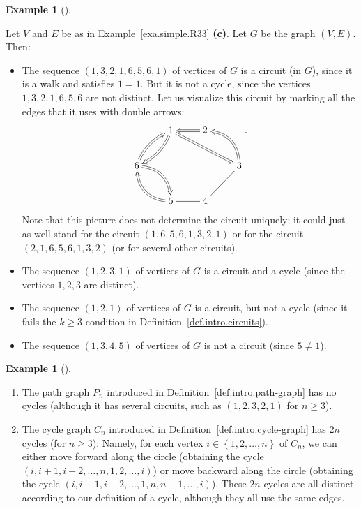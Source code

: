 \documentclass[numbers=enddot,12pt,final,onecolumn,notitlepage]{scrartcl}%
\makeatletter
\theoremstyle{definition}
\newtheorem{exam}[theo]{Example}
\newenvironment{example}[1][]
{\begin{exam}[#1]\begin{leftbar}}
{\end{leftbar}\end{exam}}
\newcommand{\set}[1]{\left\{ #1 \right\}}
\newcommand{\tup}[1]{\left( #1 \right)}
\newcommand{\are}{\ar@{-}}
\makeatother
\begin{document}
\begin{example} \label{exa.intro.circuits}
Let $V$ and $E$ be as in Example~\ref{exa.simple.R33} \textbf{(c)}.
Let $G$ be the graph $\tup{V, E}$. Then:

\begin{itemize}
\item The sequence $\tup{1, 3, 2, 1, 6, 5, 6, 1}$ of vertices of $G$
is a circuit (in $G$), since it is a walk and satisfies $1 = 1$.
But it is not a cycle, since the vertices $1, 3, 2, 1, 6, 5, 6$ are
not distinct.
Let us visualize this circuit by marking all the edges that it uses with
double arrows:
\begin{align*}
\xymatrix{
& 1 \ar@{=>}[rrd] \ar@/^0.5pc/@{=>}[ld] & 2 \ar@{=>}[l] \\
6 \ar@/^0.5pc/@{=>}[ru] \ar@/^1pc/@{=>}[rd] & & & 3 \are[ld] \ar@/_1pc/@{=>}[lu] \\
& 5 \ar@/^1pc/@{=>}[lu] & 4 \are[l]
} .
\end{align*}
Note that this picture does not determine the circuit uniquely;
it could just as well stand for the circuit
$\tup{1, 6, 5, 6, 1, 3, 2, 1}$ or for the circuit
$\tup{2, 1, 6, 5, 6, 1, 3, 2}$ (or for several other
circuits).

\item The sequence $\tup{1, 2, 3, 1}$ of vertices of $G$ is a circuit
and a cycle (since the vertices $1, 2, 3$ are distinct).

\item The sequence $\tup{1, 2, 1}$ of vertices of $G$ is a circuit,
but not a cycle (since it fails the $k \geq 3$ condition in
Definition~\ref{def.intro.circuits}).

\item The sequence $\tup{1, 3, 4, 5}$ of vertices of $G$ is not a
circuit (since $5 \neq 1$).
\end{itemize}
\end{example}

\begin{example}

\begin{enumerate}

\item[\textbf{(a)}]
The path graph $P_n$ introduced in
Definition~\ref{def.intro.path-graph}
has no cycles (although it has several circuits, such as
$\tup{1, 2, 3, 2, 1}$ for $n \geq 3$).

\item[\textbf{(b)}]
The cycle graph $C_n$ introduced in
Definition~\ref{def.intro.cycle-graph} has $2n$ cycles
(for $n \geq 3$):
Namely, for each vertex $i \in \set{1, 2, \ldots, n}$ of $C_n$,
we can either move forward along the circle (obtaining the
cycle $\tup{i, i+1, i+2, \ldots, n, 1, 2, \ldots, i}$)
or move backward along the circle (obtaining the cycle
$\tup{i, i-1, i-2, \ldots, 1, n, n-1, \ldots, i}$).
These $2n$ cycles are all distinct according to our definition
of a cycle, although they all use the same edges.

\end{enumerate}

\end{example}
\end{document}
